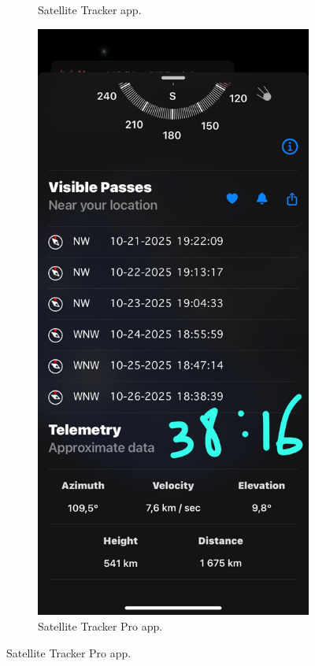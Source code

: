 \documentclass{article}
\begin{document}
\begin{figure}[h!]
\begin{subfigure}[b]{0.35\textwidth}
        \caption{Satellite Tracker app.}
        \label{fig:tracker_screenshot}
    \end{subfigure}
    \begin{subfigure}[b]{0.35\textwidth}
        \centering
        \includegraphics[width=\textwidth]{LaTeX/Figures/Satellite_Tracker_Pro_Screenshot.jpg}
        \caption{Satellite Tracker Pro app.}
        \label{fig:tracker_pro_screenshot}
    \end{subfigure}
    
\end{figure}
\end{document}
